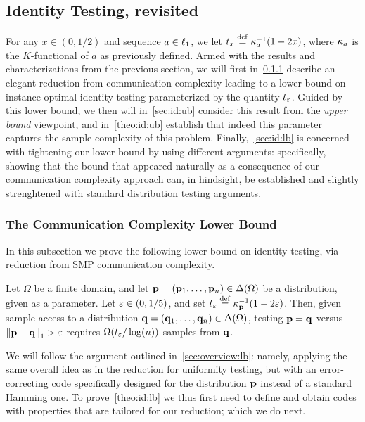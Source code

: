 \subsection{Identity Testing, revisited}\label{sec:instanceoptimal:identity}
For any $x\in(0,1/2)$ and sequence $a\in\lp[1]$, we let $t_x \eqdef \kf{a}^{-1}(1-2x)$, where $\kf{a}$ is the $K$-functional of $a$ as previously defined. Armed with the results and characterizations from the previous section, we will first in~\cref{sec:id:lb:cc} describe an elegant reduction from communication complexity leading to a lower bound on instance-optimal identity testing parameterized by the quantity $t_\eps$. Guided by this lower bound, we then will in~\cref{sec:id:ub} consider this result from the \emph{upper bound} viewpoint, and in~\cref{theo:id:ub} establish that indeed this parameter captures the sample complexity of this problem. Finally,~\cref{sec:id:lb} is concerned with tightening our lower bound by using different arguments: specifically, showing that the bound that appeared naturally as a consequence of our communication complexity approach can, in hindsight, be established and slightly strenghtened with standard distribution testing arguments.

\subsubsection{The Communication Complexity Lower Bound}\label{sec:id:lb:cc}
In this subsection we prove the following lower bound on identity testing, via reduction from SMP communication complexity.

\begin{theorem}
\label{theo:id:lb}
Let $\Omega$ be a finite domain, and let $\p = (\p_1,\ldots, \p_n) \in \distribs{\Omega}$ be a distribution, given as a parameter. Let $\eps\in(0,1/5)$, and set $t_\eps \eqdef \kf{\p}^{-1}(1-2\eps)$. Then, given sample access to a distribution $\q = (\q_1,\ldots, \q_n) \in \distribs{\Omega}$,
testing $\p=\q$ versus $\normone{\p-\q} > \eps$ requires $\bigOmega{t_\eps/\log(n)}$ samples from $\q$.
\end{theorem}

We will follow the argument outlined in~\cref{sec:overview:lb}: namely, applying the same overall idea as in the reduction for uniformity testing, but with an error-correcting code specifically designed for the distribution $\p$ instead of a standard Hamming one. 
To prove~\cref{theo:id:lb} we thus first need to define and obtain codes with properties that are tailored for our reduction; which we do next.

